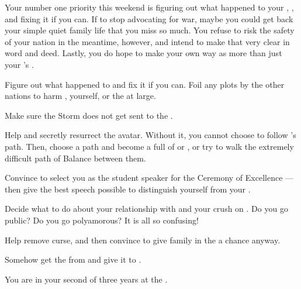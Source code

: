 \documentclass[char]{GL2020}
\begin{document}
Your number one priority this weekend is figuring out what happened to your \cLoud{\parent}, \cLoud{}, and fixing it if you can. If \cLoud{\theywere} to stop advocating for war, maybe you could get back your simple quiet family life that you miss so much. You refuse to risk the safety of your nation in the meantime, however, and intend to make that very clear in word and deed. Lastly, you do hope to make your own way as more than just your \cLoud{\parent}'s \cWarlordDaughter{\offspring}.

\begin{itemz}
    \item Figure out what happened to \cLoud{} and fix it if you can. Foil any plots by the other nations to harm \cLoud{}, yourself, or the \pShip{} at large.
    \item Make sure the Storm does not get sent to the \pShip{}.
    \item Help \cFlowPriest{} and \cEbbPriest{} secretly resurrect the \cEbb{} avatar. Without it, you cannot choose to follow \cEbb{}'s path. Then, choose a path and become a full \cWarlordDaughter{\cleric} of \cEbb{} or \cFlow{}, or try to walk the extremely difficult path of Balance between them.
    \item Convince \cMusic{} to select you as the student speaker for the Ceremony of Excellence — then give the best speech possible to distinguish yourself from your \cLoud{\parent}.
    \item Decide what to do about your relationship with \cTechStar{} and your crush on \cInitiate{}. Do you go public? Do you go polyamorous? It is all so confusing!
    \item Help \cInitiate{} remove \cInitiate{\their} curse, and then convince \cInitiate{\them} to give \cInitiate{\their} family in the \pFarm{} a chance anyway.
    \item Somehow get the \iMirror{} from \cDiplomat{} and give it to \cHeir{}.
\end{itemz}

\begin{itemz}[Notes]
    \item You are in your second of three years at the \pSchool{}.
\end{itemz}
\end{document}
